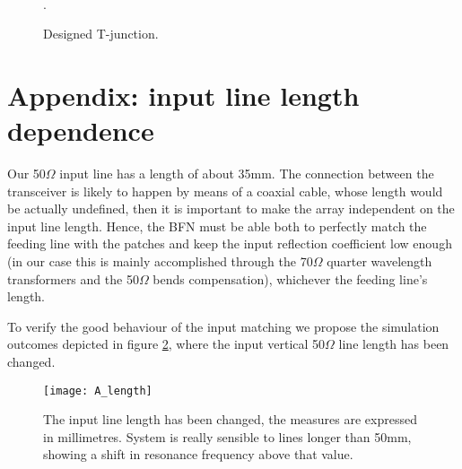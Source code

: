 \begin{figure}[H] 
	\centering
	\quad
	\\
	\caption{Designed T-junction.}.
	\label{fig:p3_mitered_junctions}
\end{figure}

\newpage
\section{Appendix: input line length dependence}

Our 50$\Omega$ input line has a length of about 35mm. The connection between the transceiver is likely to happen by means of a coaxial cable, whose length would be actually undefined, then it is important to make the array independent on the input line length. Hence, the BFN must be able both to perfectly match the feeding line with the patches and keep the input reflection coefficient low enough (in our case this is mainly accomplished through the 70$\Omega$ quarter wavelength transformers and the 50$\Omega$ bends compensation), whichever the feeding line's length.

To verify the good behaviour of the input matching we propose the simulation outcomes depicted in figure \ref{fig:A_INlineL}, where the input vertical 50$\Omega$ line length has been changed. 

\begin{figure}[H] 
	\centering
	\texttt{[image: A\_length]}
	\caption{The input line length has been changed, the measures are expressed in millimetres. System is really sensible to lines longer than 50mm, showing a shift in resonance frequency above that value.}
	\label{fig:A_INlineL}
\end{figure}
